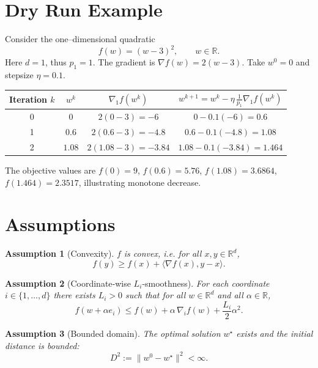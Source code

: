 \documentclass{article}
\newtheorem{assumption}{Assumption}
\begin{document}
\section*{Dry Run Example}
Consider the one–dimensional quadratic
\[
f(w)=(w-3)^{2},\qquad w\in\mathbb{R}.
\]
Here $d=1$, thus $p_{1}=1$.  The gradient is $\nabla f(w)=2(w-3)$.
Take $w^{0}=0$ and stepsize $\eta=0.1$.

\begin{center}
\begin{tabular}{c|c|c|c}
Iteration $k$ & $w^{k}$ & $\nabla_{1}f(w^{k})$ & $w^{k+1}=w^{k}-\eta\,\frac{1}{p_{1}}\nabla_{1}f(w^{k})$\\ \hline
0 & $0$ & $2(0-3)=-6$ & $0-0.1(-6)=0.6$\\
1 & $0.6$ & $2(0.6-3)=-4.8$ & $0.6-0.1(-4.8)=1.08$\\
2 & $1.08$ & $2(1.08-3)=-3.84$ & $1.08-0.1(-3.84)=1.464$\\
\end{tabular}
\end{center}
The objective values are $f(0)=9$, $f(0.6)=5.76$, $f(1.08)=3.6864$, $f(1.464)=2.3517$, illustrating monotone decrease.

\section*{Assumptions}
\begin{assumption}[Convexity]\label{ass:convex}
$f$ is convex, i.e. for all $x,y\in\mathbb{R}^{d}$,
\[
f(y)\ge f(x)+\langle\nabla f(x),y-x\rangle .
\tag{3}
\]
\end{assumption}

\begin{assumption}[Coordinate‑wise $L_i$‑smoothness]\label{ass:smooth}
For each coordinate $i\in\{1,\dots ,d\}$ there exists $L_i>0$ such that for all $w\in\mathbb{R}^{d}$ and all $\alpha\in\mathbb{R}$,
\[
f(w+\alpha e_i)\le f(w)+\alpha\,\nabla_i f(w)+\frac{L_i}{2}\alpha^{2}.
\tag{4}
\]
\end{assumption}

\begin{assumption}[Bounded domain]\label{ass:bounded}
The optimal solution $w^{\star}$ exists and the initial distance is bounded:
\[
D^{2}:=\|w^{0}-w^{\star}\|^{2}<\infty .
\tag{5}
\]
\end{assumption}
\end{document}
